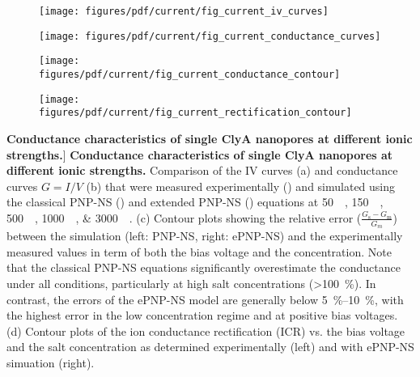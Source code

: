 \begin{figure*}[htbp]
	\centering
	\begin{subfigure}[t]{4cm}
		\centering
		\caption{}\label{fig:current_iv_curves}
		\texttt{[image: figures/pdf/current/fig\_current\_iv\_curves]}
	\end{subfigure}
	\hspace{-0.5cm}
	\begin{subfigure}[t]{4cm}
		\centering
		\caption{}\label{fig:current_conductance_curves}
		\texttt{[image: figures/pdf/current/fig\_current\_conductance\_curves]}
	\end{subfigure}
	\begin{minipage}[t]{8.5cm}
		\begin{subfigure}[t]{9cm}
			\centering
			\caption{}\label{fig:current_conductance_contour}
			\texttt{[image: figures/pdf/current/fig\_current\_conductance\_contour]}
		\end{subfigure}
		
		\begin{subfigure}[t]{9cm}
			\centering
			\caption{}\label{fig:current_rectification_contour}
			\texttt{[image: figures/pdf/current/fig\_current\_rectification\_contour]}
		\end{subfigure}
	\end{minipage}
	
	\caption
	[\textbf{Conductance characteristics of single ClyA nanopores at different ionic strengths.}]
	{
		\textbf{Conductance characteristics of single ClyA nanopores at different ionic strengths.}
		Comparison of the IV curves (a) and conductance curves $G = I/V$ (b) that were measured 
		experimentally () and simulated using the classical PNP-NS 
		() and extended PNP-NS () equations  at 
		\SIlist[list-units=single]{50;150;500;1000;3000}{\milli\Molar}.
		(c) Contour plots showing the relative error ($\displaystyle\frac{G_\text{s}-G_\text{m}}{G_{m}}$) 
		between the simulation (left: PNP-NS, right: ePNP-NS) and the experimentally measured values in term 
		of both the bias voltage and the concentration.
		Note that the classical PNP-NS equations significantly overestimate the conductance under all 
		conditions, particularly at high salt concentrations (\SI{>100}{\percent}).
		In contrast, the errors of the ePNP-NS model are generally below \SIrange{5}{10}{\percent}, with the 
		highest error in the low concentration regime and at positive bias voltages.
		(d) Contour plots of the ion conductance rectification (ICR) vs. the bias voltage and the salt 
		concentration as determined experimentally (left) and with ePNP-NS simuation (right).
	}
	
	\label{fig:conductance}
	
\end{figure*}